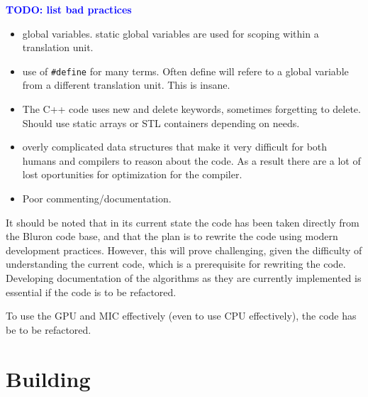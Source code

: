 \documentclass[11pt,a4paper]{article}
\newcommand{\todo}[1]{\textbf{\textcolor{blue}{TODO: #1}}} %
\newcommand{\lst}[1]{\lstinline!#1!} %
\begin{document}
\todo{list bad practices}
\begin{itemize}
    \item
        global variables. static global variables are used for scoping within a translation unit.
    \item
        use of \lst{#define} for many terms. Often define will refere to a global variable from a different translation unit. This is insane.
    \item
        The C++ code uses new and delete keywords, sometimes forgetting to delete. Should use static arrays or STL containers depending on needs.
    \item
        overly complicated data structures that make it very difficult for both humans and compilers to reason about the code. As a result there are a lot of lost oportunities for optimization for the compiler.
    \item
        Poor commenting/documentation.
\end{itemize}

It should be noted that in its current state the code has been taken directly from the Bluron code base, and that the plan is to rewrite the code using modern development practices. However, this will prove challenging, given the difficulty of understanding the current code, which is a prerequisite for rewriting the code. Developing documentation of the algorithms as they are currently implemented is essential if the code is to be refactored.

To use the GPU and MIC effectively (even to use CPU effectively), the code has be to be refactored.
\section{Building}
\end{document}
